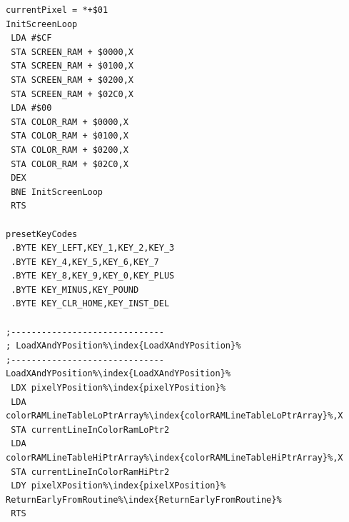 \begin{minipage}[b]{0.33\linewidth}
\begin{lrbox}{\mybox}
\begin{lstlisting}[basicstyle=\ttfamily\tiny,escapechar=\%]
currentPixel = *+$01
InitScreenLoop
 LDA #$CF
 STA SCREEN_RAM + $0000,X
 STA SCREEN_RAM + $0100,X
 STA SCREEN_RAM + $0200,X
 STA SCREEN_RAM + $02C0,X
 LDA #$00
 STA COLOR_RAM + $0000,X
 STA COLOR_RAM + $0100,X
 STA COLOR_RAM + $0200,X
 STA COLOR_RAM + $02C0,X
 DEX
 BNE InitScreenLoop
 RTS

presetKeyCodes
 .BYTE KEY_LEFT,KEY_1,KEY_2,KEY_3
 .BYTE KEY_4,KEY_5,KEY_6,KEY_7
 .BYTE KEY_8,KEY_9,KEY_0,KEY_PLUS
 .BYTE KEY_MINUS,KEY_POUND
 .BYTE KEY_CLR_HOME,KEY_INST_DEL

;------------------------------
; LoadXAndYPosition%\index{LoadXAndYPosition}%
;------------------------------
LoadXAndYPosition%\index{LoadXAndYPosition}%
 LDX pixelYPosition%\index{pixelYPosition}%
 LDA colorRAMLineTableLoPtrArray%\index{colorRAMLineTableLoPtrArray}%,X
 STA currentLineInColorRamLoPtr2
 LDA colorRAMLineTableHiPtrArray%\index{colorRAMLineTableHiPtrArray}%,X
 STA currentLineInColorRamHiPtr2
 LDY pixelXPosition%\index{pixelXPosition}%
ReturnEarlyFromRoutine%\index{ReturnEarlyFromRoutine}%
 RTS
\end{lstlisting}
\end{lrbox}%
\scalebox{0.8}{\usebox{\mybox}}
\end{minipage}
\hspace{-0.1cm}
